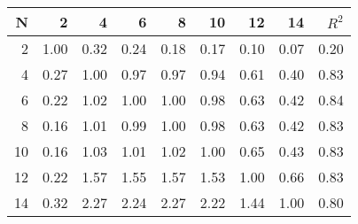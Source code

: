 \begin{tabular}{rrrrrrrrr}
\toprule
  N &     2 &     4 &     6 &     8 &    10 &    12 &    14 &  $R^2$ \\
\midrule
  2 &  1.00 &  0.32 &  0.24 &  0.18 &  0.17 &  0.10 &  0.07 &   0.20 \\
  4 &  0.27 &  1.00 &  0.97 &  0.97 &  0.94 &  0.61 &  0.40 &   0.83 \\
  6 &  0.22 &  1.02 &  1.00 &  1.00 &  0.98 &  0.63 &  0.42 &   0.84 \\
  8 &  0.16 &  1.01 &  0.99 &  1.00 &  0.98 &  0.63 &  0.42 &   0.83 \\
 10 &  0.16 &  1.03 &  1.01 &  1.02 &  1.00 &  0.65 &  0.43 &   0.83 \\
 12 &  0.22 &  1.57 &  1.55 &  1.57 &  1.53 &  1.00 &  0.66 &   0.83 \\
 14 &  0.32 &  2.27 &  2.24 &  2.27 &  2.22 &  1.44 &  1.00 &   0.80 \\
\bottomrule
\end{tabular}

